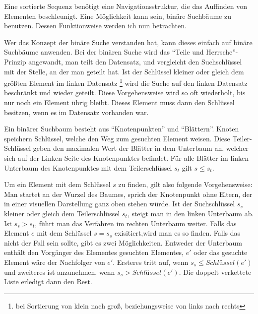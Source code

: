 Eine sortierte Sequenz benötigt eine Navigationsstruktur, die das Auffinden von Elementen beschleunigt. Eine Möglichkeit kann sein, binäre Suchbäume zu benutzen. Dessen Funktionweise werden ich nun betrachten.
\par
Wer das Konzept der binäre Suche verstanden hat, kann dieses einfach auf binäre Suchbäume anwenden. Bei der binären Suche wird das "`Teile und Herrsche"'-Prinzip angewandt, man teilt den Datensatz, und vergleicht den Suchschlüssel mit der Stelle, an der man geteilt hat. Ist der Schlüssel kleiner oder gleich dem größten Element im linken Datensatz \footnote{bei Sortierung von klein nach groß, beziehungsweise von links nach rechts} wird die Suche auf den linken Datensatz beschränkt und wieder geteilt. Diese Vorgehensweise wird so oft wiederholt, bis nur noch ein Element übrig bleibt. Dieses Element muss dann den Schlüssel besitzen, wenn es im Datensatz vorhanden war.
\par
Ein binärer Suchbaum besteht aus "`Knotenpunkten"' und "`Blättern"'. Knoten speichern Schlüssel, welche den Weg zum gesuchten Element weisen. Diese Teiler-Schlüssel geben den maximalen Wert der Blätter in dem Unterbaum an, welcher sich auf der Linken Seite des Knotenpunktes befindet. Für alle Blätter im linken Unterbaum des Knotenpunktes mit dem Teilerschlüssel $s_t$ gilt $s \leq s_t$.
\par
Um ein Element mit dem Schlüssel $s$ zu finden, gilt also folgende Vorgehensweise: Man startet an der Wurzel des Baumes, sprich der Knotenpunkt ohne Eltern, der in einer visuellen Darstellung ganz oben stehen würde. Ist der Suchschlüssel $s_s$ kleiner oder gleich dem Teilerschlüssel $s_t$, steigt man in den linken Unterbaum ab. Ist $s_s>s_t$, führt man das Verfahren im rechten Unterbaum weiter. Falls das Element $e$ mit dem Schlüssel $s=s_s$ exisitiert,wird man es so finden. Falls das nicht der Fall sein sollte, gibt es zwei Möglichkeiten. Entweder der Unterbaum enthält den Vorgänger des Elementes gesuchten Elementes, $e'$ oder das gesuchte Element wäre der Nachfolger von $e'$. Ersteres tritt auf, wenn $s_s \leq Schlüssel(e')$ und zweiteres ist anzunehmen, wenn $s_s>Schlüssel(e')$. \cite{Sanders:19} Die doppelt verkettete Liste erledigt dann den Rest.
\par
